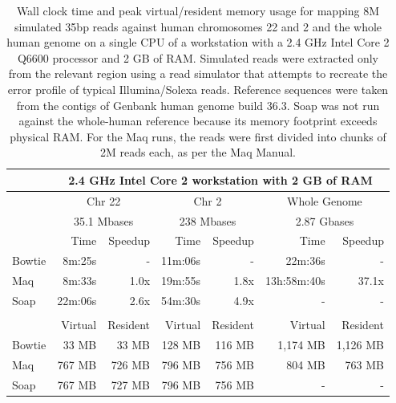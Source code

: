 \documentclass[letterpaper]{article}
\begin{document}
\begin{table}[tp]
\scriptsize
\begin{tabular}{lrrrrrr}
 & \multicolumn{6}{c}{2.4 GHz Intel Core 2 workstation with 2 GB of RAM} \\[3pt] 
\toprule
 & \multicolumn{2}{c}{Chr 22} & \multicolumn{2}{c}{Chr 2} & \multicolumn{2}{c}{Whole Genome} \\[3pt] 
 & \multicolumn{2}{c}{35.1 Mbases} & \multicolumn{2}{c}{238 Mbases} & \multicolumn{2}{c}{2.87 Gbases} \\[3pt] 
 & Time & Speedup & Time & Speedup & Time & Speedup \\ 
\toprule
Bowtie & 8m:25s & - & 11m:06s & - & 22m:36s & -  \\ \midrule 
Maq & 8m:33s & 1.0x & 19m:55s & 1.8x & 13h:58m:40s & 37.1x  \\ \midrule 
Soap & 22m:06s & 2.6x & 54m:30s & 4.9x & - & -  \\[2pt] \bottomrule \\ 
 & Virtual & Resident & Virtual & Resident & Virtual & Resident \\ 
\toprule
Bowtie & 33 MB & 33 MB & 128 MB & 116 MB & 1,174 MB & 1,126 MB  \\ \midrule 
Maq & 767 MB & 726 MB & 796 MB & 756 MB & 804 MB & 763 MB  \\ \midrule 
Soap & 767 MB & 727 MB & 796 MB & 756 MB & - & -  \\ 
\bottomrule
\end{tabular}
\scriptsize\caption{Wall clock time and peak virtual/resident memory usage for mapping 8M simulated 35bp reads against human chromosomes 22 and 2 and the whole human genome on a single CPU of a workstation with a 2.4 GHz Intel Core 2 Q6600 processor and 2 GB of RAM. Simulated reads were extracted only from the relevant region using a read simulator that attempts to recreate the error profile of typical Illumina/Solexa reads. Reference sequences were taken from the contigs of Genbank human genome build 36.3. Soap was not run against the whole-human reference because its memory footprint exceeds physical RAM. For the Maq runs, the reads were first divided into chunks of 2M reads each, as per the Maq Manual.}
\end{table}
\end{document}
